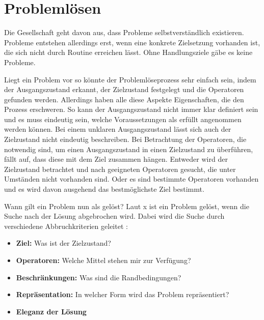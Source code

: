 
\section{Problemlösen}
Die Gesellschaft geht davon aus, dass Probleme selbstverständlich existieren. Probleme entstehen allerdings erst, wenn eine konkrete Zielsetzung vorhanden ist, die sich nicht durch Routine erreichen lässt. Ohne Handlungsziele gäbe es keine Probleme. \cite{Funke2015, Betsch2011,  Dorner1984}

Liegt ein Problem vor so könnte der Problemlöseprozess sehr einfach sein, indem der Ausgangszustand erkannt, der Zielzustand festgelegt und die Operatoren gefunden werden. Allerdings haben alle diese Aspekte Eigenschaften, die den Prozess erschweren. So kann der Ausgangszustand nicht immer klar definiert sein und es muss eindeutig sein, welche Voraussetzungen als erfüllt angenommen werden können. Bei einem unklaren Ausgangszustand lässt sich auch der Zielzustand nicht eindeutig beschreiben. Bei Betrachtung der Operatoren, die notwendig sind, um einen Ausgangszustand in einen Zielzustand zu überführen, fällt auf, dass diese mit dem Ziel zusammen hängen. Entweder wird der Zielzustand betrachtet und nach geeigneten Operatoren gesucht, die unter Umständen nicht vorhanden sind. Oder es sind bestimmte Operatoren vorhanden und es wird davon ausgehend das bestmöglichste Ziel bestimmt. \cite{Funke2015}

Wann gilt ein Problem nun als gelöst? Laut x ist ein Problem gelöst, wenn die Suche nach der Lösung abgebrochen wird. Dabei wird die Suche durch verschiedene Abbruchkriterien geleitet \cite{Funke2015}:
\begin{itemize}
\item \textbf{Ziel:} Was ist der Zielzustand?
\item \textbf{Operatoren:} Welche Mittel stehen mir zur Verfügung?
\item \textbf{Beschränkungen:} Was sind die Randbedingungen?
\item \textbf{Repräsentation:} In welcher Form wird das Problem repräsentiert?
\item \textbf{Eleganz der Lösung} 
\end{itemize}

